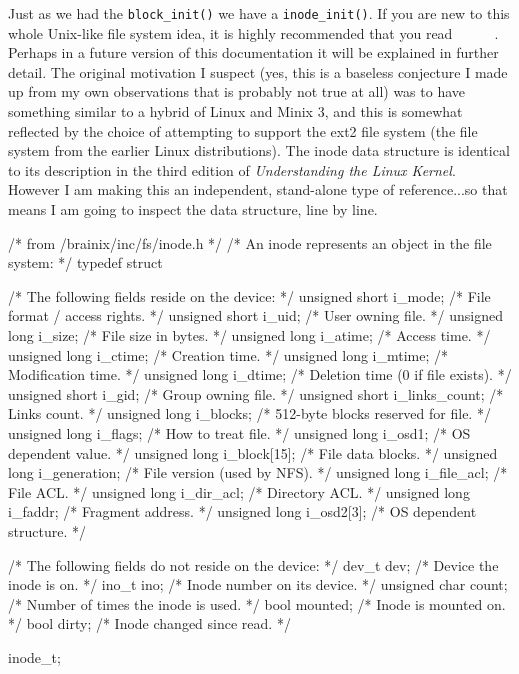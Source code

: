 Just as we had the \verb|block_init()| we have a \verb|inode_init()|. If you are new to this whole Unix-like file system idea, it is highly recommended that you read~\cite{1}~\cite{2}~\cite{3}~\cite{4}~\cite{5}~\cite{6}. Perhaps in a future version of this documentation it will be explained in further detail. The original motivation I suspect (yes, this is a baseless conjecture I made up from my own observations that is probably not true at all) was to have something similar to a hybrid of Linux and Minix 3, and this is somewhat reflected by the choice of attempting to support the ext2 file system (the file system from the earlier Linux distributions). The inode data structure is identical to its description in the third edition of \textit{Understanding the Linux Kernel}. However I am making this an independent, stand-alone type of reference...so that means I am going to inspect the data structure, line by line.
\begin{code}[numbers=left,firstnumber=42]
/* from /brainix/inc/fs/inode.h */
/* An inode represents an object in the file system: */
typedef struct
{
     /* The following fields reside on the device: */
     unsigned short i_mode;        /* File format / access rights.       */
     unsigned short i_uid;         /* User owning file.                  */
     unsigned long i_size;         /* File size in bytes.                */
     unsigned long i_atime;        /* Access time.                       */
     unsigned long i_ctime;        /* Creation time.                     */
     unsigned long i_mtime;        /* Modification time.                 */
     unsigned long i_dtime;        /* Deletion time (0 if file exists).  */
     unsigned short i_gid;         /* Group owning file.                 */
     unsigned short i_links_count; /* Links count.                       */
     unsigned long i_blocks;       /* 512-byte blocks reserved for file. */
     unsigned long i_flags;        /* How to treat file.                 */
     unsigned long i_osd1;         /* OS dependent value.                */
     unsigned long i_block[15];    /* File data blocks.                  */
     unsigned long i_generation;   /* File version (used by NFS).        */
     unsigned long i_file_acl;     /* File ACL.                          */
     unsigned long i_dir_acl;      /* Directory ACL.                     */
     unsigned long i_faddr;        /* Fragment address.                  */
     unsigned long i_osd2[3];      /* OS dependent structure.            */

     /* The following fields do not reside on the device: */
     dev_t dev;                    /* Device the inode is on.            */
     ino_t ino;                    /* Inode number on its device.        */
     unsigned char count;          /* Number of times the inode is used. */
     bool mounted;                 /* Inode is mounted on.               */
     bool dirty;                   /* Inode changed since read.          */
} inode_t;
\end{code}
